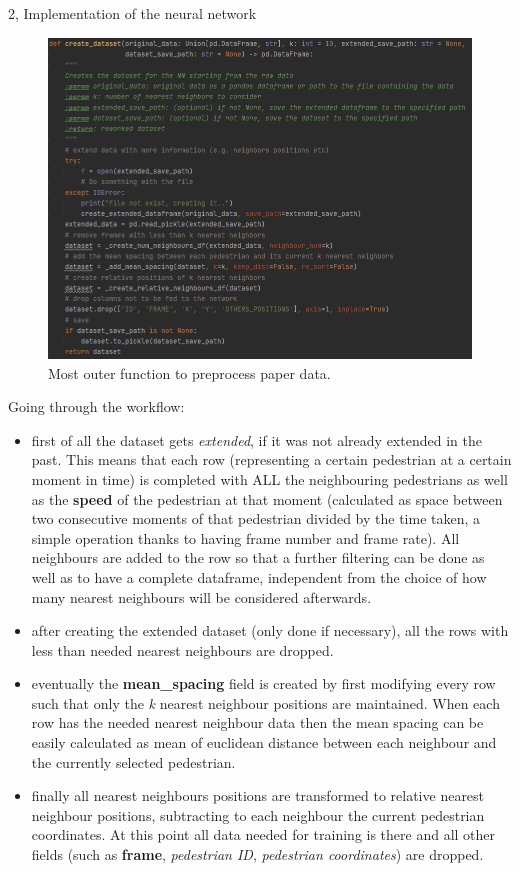 \documentclass[10pt,a4paper]{article}
\begin{document}
\begin{task}{2, Implementation of the neural network}
\begin{figure}[h]
    \centering
    \includegraphics[scale=0.8]{images/preprocess-data.png}
    \caption{Most outer function to preprocess paper data.}
    \label{fig:preproc-data}
\end{figure}

Going through the workflow:
\begin{itemize}
    \item first of all the dataset gets \textit{extended}, if it was not already extended in the past. This means that each row (representing a certain pedestrian at a certain moment in time) is completed with ALL the neighbouring pedestrians as well as the \textbf{speed} of the pedestrian at that moment (calculated as space between two consecutive moments of that pedestrian divided by the time taken, a simple operation thanks to having frame number and frame rate). All neighbours are added to the row so that a further filtering can be done as well as to have a complete dataframe, independent from the choice of how many nearest neighbours will be considered afterwards.
    \item after creating the extended dataset (only done if necessary), all the rows with less than needed nearest neighbours are dropped.
    \item eventually the \textbf{mean\_spacing} field is created by first modifying every row such that only the \textit{k} nearest neighbour positions are maintained. When each row has the needed nearest neighbour data then the mean spacing can be easily calculated as mean of euclidean distance between each neighbour and the currently selected pedestrian.
    \item finally all nearest neighbours positions are transformed to relative nearest neighbour positions, subtracting to each neighbour the current pedestrian coordinates. At this point all data needed for training is there and all other fields (such as \textbf{frame}, \textit{pedestrian ID}, \textit{pedestrian coordinates}) are dropped.
\end{itemize}


\end{task}
\end{document}
